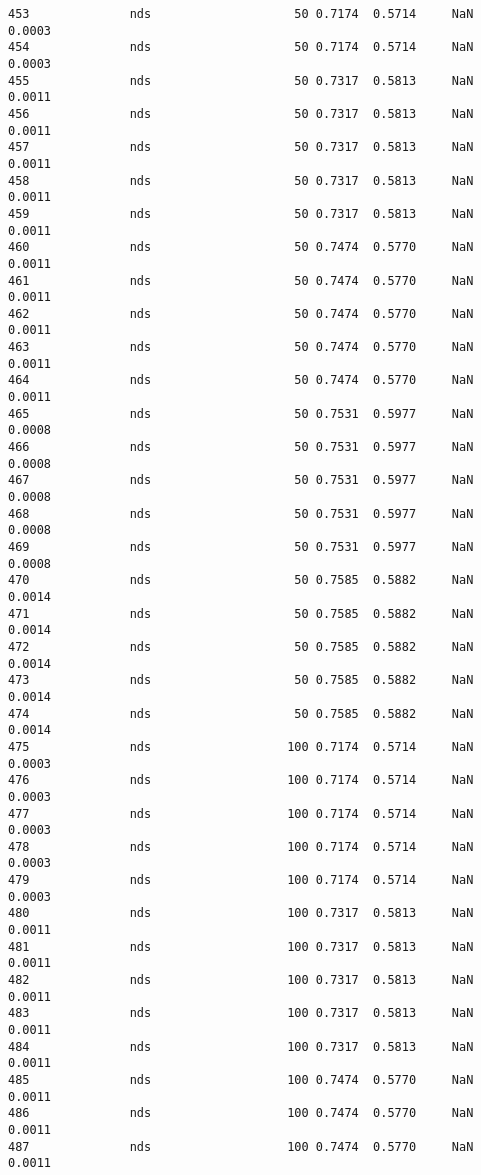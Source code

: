 \documentclass[11pt]{article}
\begin{document}
\begin{Verbatim}[commandchars=\\\{\}]
453              nds                    50 0.7174  0.5714     NaN 0.0003   
454              nds                    50 0.7174  0.5714     NaN 0.0003   
455              nds                    50 0.7317  0.5813     NaN 0.0011   
456              nds                    50 0.7317  0.5813     NaN 0.0011   
457              nds                    50 0.7317  0.5813     NaN 0.0011   
458              nds                    50 0.7317  0.5813     NaN 0.0011   
459              nds                    50 0.7317  0.5813     NaN 0.0011   
460              nds                    50 0.7474  0.5770     NaN 0.0011   
461              nds                    50 0.7474  0.5770     NaN 0.0011   
462              nds                    50 0.7474  0.5770     NaN 0.0011   
463              nds                    50 0.7474  0.5770     NaN 0.0011   
464              nds                    50 0.7474  0.5770     NaN 0.0011   
465              nds                    50 0.7531  0.5977     NaN 0.0008   
466              nds                    50 0.7531  0.5977     NaN 0.0008   
467              nds                    50 0.7531  0.5977     NaN 0.0008   
468              nds                    50 0.7531  0.5977     NaN 0.0008   
469              nds                    50 0.7531  0.5977     NaN 0.0008   
470              nds                    50 0.7585  0.5882     NaN 0.0014   
471              nds                    50 0.7585  0.5882     NaN 0.0014   
472              nds                    50 0.7585  0.5882     NaN 0.0014   
473              nds                    50 0.7585  0.5882     NaN 0.0014   
474              nds                    50 0.7585  0.5882     NaN 0.0014   
475              nds                   100 0.7174  0.5714     NaN 0.0003   
476              nds                   100 0.7174  0.5714     NaN 0.0003   
477              nds                   100 0.7174  0.5714     NaN 0.0003   
478              nds                   100 0.7174  0.5714     NaN 0.0003   
479              nds                   100 0.7174  0.5714     NaN 0.0003   
480              nds                   100 0.7317  0.5813     NaN 0.0011   
481              nds                   100 0.7317  0.5813     NaN 0.0011   
482              nds                   100 0.7317  0.5813     NaN 0.0011   
483              nds                   100 0.7317  0.5813     NaN 0.0011   
484              nds                   100 0.7317  0.5813     NaN 0.0011   
485              nds                   100 0.7474  0.5770     NaN 0.0011   
486              nds                   100 0.7474  0.5770     NaN 0.0011   
487              nds                   100 0.7474  0.5770     NaN 0.0011   

\end{Verbatim}
\end{document}
